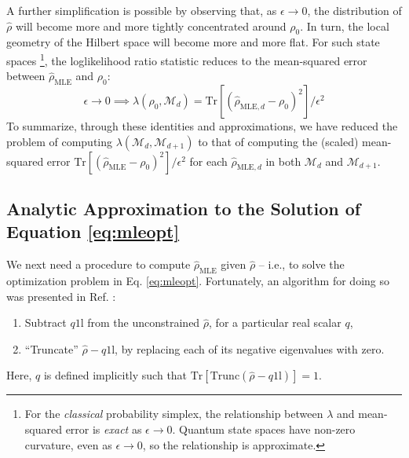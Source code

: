 \documentclass[aps,pra, twocolumn]{revtex4-1}
\newcommand{\M}{\mathcal{M}}
\newcommand{\Tr}{\mathrm{Tr}}
\def\Id{1\!\mathrm{l}}
\newcommand{\rhohat}{\hat{\rho}}
\newcommand{\rhoMLE}{\rhohat_{\scriptscriptstyle\mathrm{MLE}}}
\begin{document}

A further simplification is possible by observing that, as $\epsilon \rightarrow 0$, the distribution of $\hat{\rho}$ will become more and more tightly concentrated around $\rho_{0}$. In turn, the local geometry of the Hilbert space will become more and more flat. For such state spaces \footnote{For the \emph{classical} probability simplex, the relationship between $\lambda$ and mean-squared error is \emph{exact} as $\epsilon \rightarrow 0$. Quantum state spaces have non-zero curvature, even as $\epsilon \rightarrow 0$, so the relationship is approximate.}, the loglikelihood ratio statistic reduces to the mean-squared error between $\rhoMLE$ and $\rho_{0}$:
\begin{equation}
\label{eq:llrs2}
\epsilon \rightarrow 0 \implies \lambda(\rho_{0}, \M_{d}) = \mathrm{Tr}[(\hat{\rho}_{\mathrm{MLE},d} - \rho_{0})^{2}]/\epsilon^{2}
\end{equation}
To summarize, through these identities and approximations, we have reduced the problem of computing $\lambda(\M_{d}, \M_{d+1})$ to that of computing the (scaled) mean-squared error $\mathrm{Tr}[(\rhoMLE - \rho_{0})^{2}]/\epsilon^{2}$ for each $\hat{\rho}_{\mathrm{MLE},d}$ in both $\M_{d}$ and $\M_{d+1}$.


\subsection{Analytic Approximation to the Solution of Equation \eqref{eq:mleopt}}


We next need a procedure to compute $\rhoMLE$ given $\rhohat$ -- i.e., to solve the optimization problem in Eq. \eqref{eq:mleopt}.  Fortunately, an algorithm for doing so was presented in Ref. \cite{Smolin2012}:
\begin{enumerate}[noitemsep]
\item Subtract $q\Id$ from the unconstrained $\hat\rho$, for a particular real scalar $q$,
\item ``Truncate'' $\hat\rho-q\Id$, by replacing each of its negative eigenvalues with zero.
\end{enumerate}
Here, $q$ is defined implicitly such that $\Tr\left[ \mathrm{Trunc}(\hat\rho-q\Id)\right] = 1$.
\end{document}
